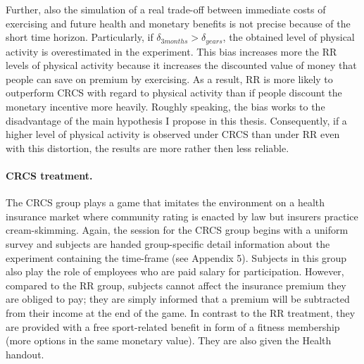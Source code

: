 \documentclass[12pt,english]{article}%
\begin{document}
Further, also the simulation of a real trade-off between immediate costs of exercising and future health and monetary benefits is not precise because of the short time horizon. Particularly, if $\delta_{3months}>\delta_{years}$, the obtained level of physical activity is overestimated in the experiment. This bias increases more the RR levels of physical activity because it increases the discounted value of money that people can save on premium by exercising. As a result, RR is more likely to outperform CRCS with regard to physical activity than if people discount the monetary incentive more heavily. Roughly speaking, the bias works to the disadvantage of the main hypothesis I propose in this thesis. Consequently, if a higher level of physical activity is observed under CRCS than under RR even with this distortion, the results are more rather then less reliable.   
 
\paragraph{CRCS treatment.} The CRCS group plays a game that imitates the environment on a health insurance market where community rating is enacted by law but insurers practice cream-skimming. Again, the session for the CRCS group begins with a uniform survey and subjects are handed group-specific detail information about the experiment containing the time-frame (see Appendix 5). Subjects in this group also play the role of employees who are paid salary for participation. However, compared to the RR group, subjects cannot affect the insurance premium they are obliged to pay; they are simply informed that a premium will be subtracted from their income at the end of the game. In contrast to the RR treatment, they are provided with a free sport-related benefit in form of a fitness membership (more options in the same monetary value). They are also given the Health handout. 
\end{document}
